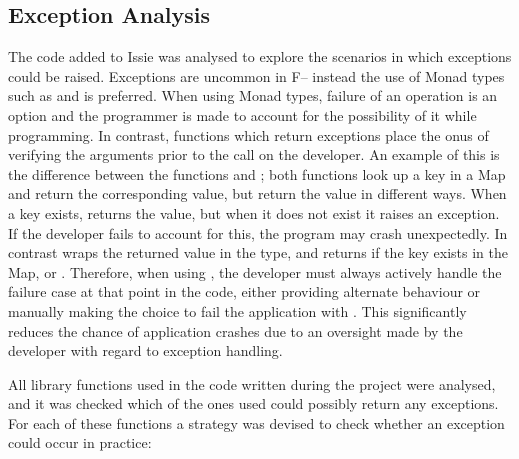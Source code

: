 \subsection{Exception Analysis}
The code added to Issie was analysed to explore the scenarios in which exceptions could be raised. Exceptions are uncommon in F\fsharp -- instead the use of Monad types such as  and  is preferred. When using Monad types, failure of an operation is an option and the programmer is made to account for the possibility of it while programming. In contrast, functions which return exceptions place the onus of verifying the arguments prior to the call on the developer. An example of this is the difference between the functions  and ; both functions look up a key in a Map and return the corresponding value, but return the value in different ways. When a key exists,  returns the value, but when it does not exist it raises an exception. If the developer fails to account for this, the program may crash unexpectedly. In contrast  wraps the returned value in the  type, and returns  if the key exists in the Map, or . Therefore, when using , the developer must always actively handle the failure case at that point in the code, either providing alternate behaviour or manually making the choice to fail the application with . This significantly reduces the chance of application crashes due to an oversight made by the developer with regard to exception handling. 

All library functions used in the code written during the project were analysed, and it was checked which of the ones used could possibly return any exceptions. For each of these functions a strategy was devised to check whether an exception could occur in practice:

